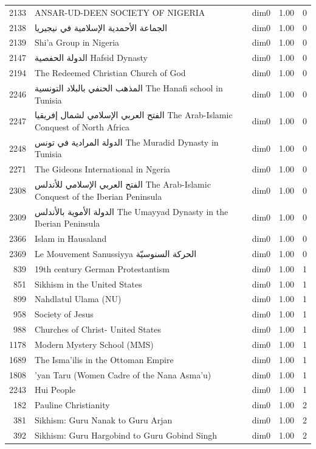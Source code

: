\begin{tabular}{rllrr}
2133 & ANSAR-UD-DEEN SOCIETY OF NIGERIA & dim0 & 1.00 & 0 \\
2138 & الجماعة الأحمدية الإسلامية في نيجيريا & dim0 & 1.00 & 0 \\
2139 & Shi'a Group in Nigeria & dim0 & 1.00 & 0 \\
2147 & الدولة الحفصية Hafsid Dynasty & dim0 & 1.00 & 0 \\
2194 & The Redeemed Christian Church of God & dim0 & 1.00 & 0 \\
2246 & المذهب الحنفي بالبلاد التونسية The Hanafi school in Tunisia & dim0 & 1.00 & 0 \\
2247 & الفتح العربي الإسلامي لشمال إفريقيا The Arab-Islamic Conquest of North Africa & dim0 & 1.00 & 0 \\
2248 & الدولة المرادية في تونس The Muradid Dynasty in Tunisia & dim0 & 1.00 & 0 \\
2271 & The Gideons International in Ngeria & dim0 & 1.00 & 0 \\
2308 & الفتح العربي الإسلامي للأندلس The Arab-Islamic Conquest of the Iberian Peninsula & dim0 & 1.00 & 0 \\
2309 & الدولة الأموية بالأندلس The Umayyad Dynasty in the Iberian Peninsula & dim0 & 1.00 & 0 \\
2366 & Islam in Hausaland & dim0 & 1.00 & 0 \\
2369 & Le Mouvement Sanussiyya الحركة السنوسيّة & dim0 & 1.00 & 0 \\
839 & 19th century German Protestantism & dim0 & 1.00 & 1 \\
851 & Sikhism in the United States & dim0 & 1.00 & 1 \\
899 & Nahdlatul Ulama (NU) & dim0 & 1.00 & 1 \\
958 & Society of Jesus & dim0 & 1.00 & 1 \\
988 & Churches of Christ- United States & dim0 & 1.00 & 1 \\
1178 & Modern Mystery School (MMS) & dim0 & 1.00 & 1 \\
1689 & The Isma'ilis in the Ottoman Empire & dim0 & 1.00 & 1 \\
1808 & 'yan Taru (Women Cadre of the Nana Asma'u) & dim0 & 1.00 & 1 \\
2243 & Hui People & dim0 & 1.00 & 1 \\
182 & Pauline Christianity & dim0 & 1.00 & 2 \\
381 & Sikhism: Guru Nanak to Guru Arjan & dim0 & 1.00 & 2 \\
392 & Sikhism: Guru Hargobind to Guru Gobind Singh & dim0 & 1.00 & 2 \\

\end{tabular}
